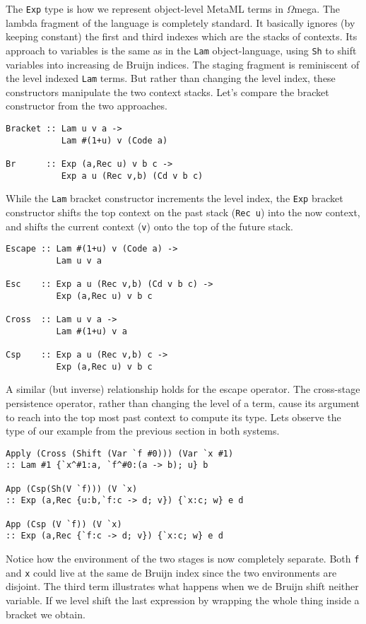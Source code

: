 \documentclass{sigplanconf}
\newcommand{\om}{$\Omega$mega}
\begin{document}
The {\tt Exp} type is how we represent object-level MetaML terms in \om.
The lambda fragment of the language is completely standard. It basically
ignores (by keeping constant) the first and third indexes which are the
stacks of contexts. Its approach to variables is the same as in the
{\tt Lam} object-language, using {\tt Sh} to shift variables into increasing
de Bruijn indices.
The staging fragment is reminiscent of the level indexed {\tt Lam}
terms. But rather than changing the level index, these constructors
manipulate the two context stacks. Let's compare
the bracket constructor from the two approaches.
\begin{verbatim}
Bracket :: Lam u v a -> 
           Lam #(1+u) v (Code a)

Br      :: Exp (a,Rec u) v b c -> 
           Exp a u (Rec v,b) (Cd v b c)
\end{verbatim}
While the {\tt Lam} bracket constructor increments the level index,
the {\tt Exp} bracket constructor shifts the top context on the past
stack ({\tt Rec u}) into the now context, and shifts the current context ({\tt v}) onto the top
of the future stack. 
\begin{verbatim}
Escape :: Lam #(1+u) v (Code a) -> 
          Lam u v a
          
Esc    :: Exp a u (Rec v,b) (Cd v b c) -> 
          Exp (a,Rec u) v b c

Cross  :: Lam u v a -> 
          Lam #(1+u) v a
          
Csp    :: Exp a u (Rec v,b) c -> 
          Exp (a,Rec u) v b c
\end{verbatim}
A similar (but inverse) relationship holds for the escape operator. The
cross-stage persistence operator, rather than changing the level of a term,
cause its argument to reach into the top most
past context to compute its type. Lets observe the type of our
example from the previous section in both systems.
\begin{verbatim}
Apply (Cross (Shift (Var `f #0))) (Var `x #1)
:: Lam #1 {`x^#1:a, `f^#0:(a -> b); u} b

App (Csp(Sh(V `f))) (V `x)
:: Exp (a,Rec {u:b,`f:c -> d; v}) {`x:c; w} e d

App (Csp (V `f)) (V `x)
:: Exp (a,Rec {`f:c -> d; v}) {`x:c; w} e d
\end{verbatim}
Notice how the environment of the two stages is now completely separate. Both
{\tt f} and {\tt x} could live at the same de Bruijn index since
the two environments are disjoint. The third term illustrates
what happens when we de Bruijn shift neither variable.
If we level shift the last expression
by wrapping the whole thing inside a bracket we obtain.
\end{document}

